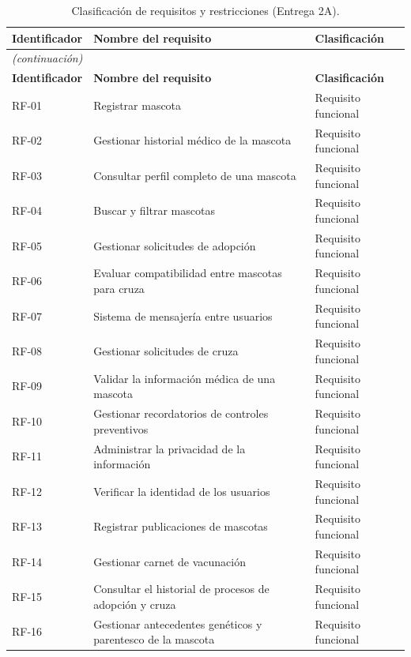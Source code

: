 \documentclass[journal,onecolumn]{IEEEtran}
\begin{document}
	\begin{longtable}{@{}p{2.2cm} p{7.5cm} p{3.5cm}@{}}
		\caption{Clasificación de requisitos y restricciones (Entrega 2A).}
		\label{tab:lista_requisitos_completa} \\
		\hline
		\textbf{Identificador} & \textbf{Nombre del requisito} & \textbf{Clasificación} \\
		\hline
		\endfirsthead
		\multicolumn{3}{|l|}{\textit{(continuación)}} \\
		\hline
		\textbf{Identificador} & \textbf{Nombre del requisito} & \textbf{Clasificación} \\
		\hline
		\endhead
		\hline
		\endfoot
		RF-01 & Registrar mascota & Requisito funcional \\
		\hline
		RF-02 & Gestionar historial médico de la mascota & Requisito funcional \\
		\hline
		RF-03 & Consultar perfil completo de una mascota & Requisito funcional \\
		\hline
		RF-04 & Buscar y filtrar mascotas & Requisito funcional \\
		\hline
		RF-05 & Gestionar solicitudes de adopción & Requisito funcional \\
		\hline
		RF-06 & Evaluar compatibilidad entre mascotas para cruza & Requisito funcional \\
		\hline
		RF-07 & Sistema de mensajería entre usuarios & Requisito funcional \\
		\hline
		RF-08 & Gestionar solicitudes de cruza & Requisito funcional \\
		\hline
		RF-09 & Validar la información médica de una mascota & Requisito funcional \\
		\hline
		RF-10 & Gestionar recordatorios de controles preventivos & Requisito funcional \\
		\hline
		RF-11 & Administrar la privacidad de la información & Requisito funcional \\
		\hline
		RF-12 & Verificar la identidad de los usuarios & Requisito funcional \\
		\hline
		RF-13 & Registrar publicaciones de mascotas & Requisito funcional \\
		\hline
		RF-14 & Gestionar carnet de vacunación & Requisito funcional \\
		\hline
		RF-15 & Consultar el historial de procesos de adopción y cruza & Requisito funcional \\
		\hline
		RF-16 & Gestionar antecedentes genéticos y parentesco de la mascota & Requisito funcional \\

\end{longtable}
\end{document}
